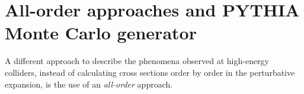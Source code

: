 
\section{All-order approaches and PYTHIA Monte Carlo generator}

A different approach to describe the phenomena observed at high-energy colliders, instead of calculating cross sections order by order in the perturbative expansion, is the use of an \textit{all-order} approach. 
\\
%

